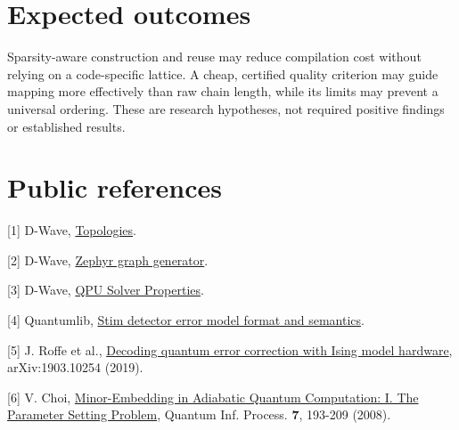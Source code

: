 \documentclass[11pt,letterpaper]{article}
\begin{document}
\section{Expected outcomes}

Sparsity-aware construction and reuse may reduce compilation cost without relying on a code-specific lattice. A cheap, certified quality criterion may guide mapping more effectively than raw chain length, while its limits may prevent a universal ordering. These are research hypotheses, not required positive findings or established results.\par

\clearpage

\section{Public references}

{\small [1] D-Wave, \href{https://docs.dwavequantum.com/en/latest/quantum_research/topologies.html}{Topologies}.\par}\vspace{5pt}

{\small [2] D-Wave, \href{https://docs.dwavequantum.com/en/latest/ocean/api_ref_graphs/generated/dwave.graphs.zephyr_graph.html}{Zephyr graph generator}.\par}\vspace{5pt}

{\small [3] D-Wave, \href{https://docs.dwavequantum.com/en/latest/quantum_research/solver_properties_all.html}{QPU Solver Properties}.\par}\vspace{5pt}

{\small [4] Quantumlib, \href{https://github.com/quantumlib/Stim/blob/main/doc/file_format_dem_detector_error_model.md}{Stim detector error model format and semantics}.\par}\vspace{5pt}

{\small [5] J. Roffe et al., \href{https://arxiv.org/abs/1903.10254}{Decoding quantum error correction with Ising model hardware}, arXiv:1903.10254 (2019).\par}\vspace{5pt}

{\small [6] V. Choi, \href{https://arxiv.org/abs/0804.4884}{Minor-Embedding in Adiabatic Quantum Computation: I. The Parameter Setting Problem}, Quantum Inf. Process. \textbf{7}, 193-209 (2008).\par}\vspace{5pt}
\end{document}
